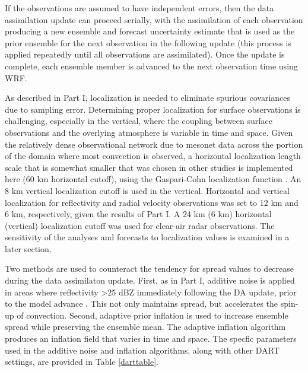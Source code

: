 If the observations are assumed to have independent errors, then the data assimilation update can proceed serially, with the assimilation of each observation producing a new ensemble and forecast uncertainty estimate that is used as the prior ensemble for the next observation in the following update (this process is applied repeatedly until all observations are assimilated). Once the update is complete, each ensemble member is advanced to the next observation time using WRF.

As described in Part I, localization is needed to eliminate spurious covariances due to sampling error. Determining proper localization for surface observations is challenging, especially in the vertical, where the coupling between surface observations and the overlying atmosphere is variable in time and space. Given the relatively dense observational network due to mesonet data across the portion of the domain where most convection is observed, a horizontal localization length scale that is somewhat smaller that was chosen in other studies is implemented here (60 km horizontal cutoff), using the Gaspari-Cohn localization function \citet{gasparicohn99}. An 8 km vertical localization cutoff is used in the vertical. Horizontal and vertical localization for reflectivity and radial velocity observations was set to 12 km and 6 km, respectively, given the results of Part I. A 24 km (6 km) horizontal (vertical) localization cutoff was used for clear-air radar observations. The sensitivity of the analyses and forecasts to localization values is examined in a later section.

Two methods are used to counteract the tendency for spread values to decrease during the data assimilaton update. First, as in Part I, additive noise is applied in areas where reflectivity \textgreater 25 dBZ immediately following the DA update, prior to the model advance \citep{dowellwicker09}. This not only maintains spread, but accelerates the spin-up of convection. Second, adaptive prior inflation \citep{anderson09} is used to increase ensemble spread while preserving the ensemble mean. The adaptive inflation algorithm produces an inflation field that varies in time and space. The specfic parameters used in the additive noise and inflation algorithms, along with other DART settings, are provided in Table \ref{darttable}.

